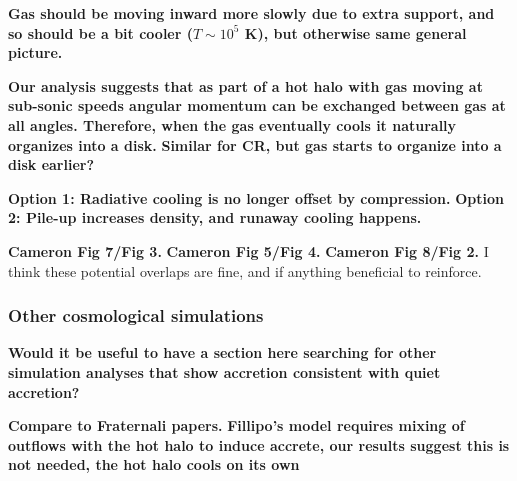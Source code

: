 \documentclass[fleqn,usenatbib]{mnras}
\begin{document}
\textbf{Gas should be moving inward more slowly due to extra support, and so should be a bit cooler ($T\sim 10^5$ K), but otherwise same general picture.}

\textbf{
Our analysis suggests that as part of a hot halo with gas moving at sub-sonic speeds angular momentum can be exchanged between gas at all angles.
Therefore, when the gas eventually cools it naturally organizes into a disk.
}
\textbf{
Similar for CR, but gas starts to organize into a disk earlier?
}

\textbf{Option 1: Radiative cooling is no longer offset by compression.}
\textbf{Option 2: Pile-up increases density, and runaway cooling happens.}

\textbf{Cameron Fig 7/Fig 3.}
\textbf{Cameron Fig 5/Fig 4.}
\textbf{Cameron Fig 8/Fig 2.}
I think these potential overlaps are fine, and if anything beneficial to reinforce.

\subsubsection{Other cosmological simulations}
\label{s: broader prevalance -- other sims}

\textbf{
Would it be useful to have a section here searching for other simulation analyses that show accretion consistent with quiet accretion?
}

\textbf{Compare to Fraternali papers.}
\textbf{Fillipo's model requires mixing of outflows with the hot halo to induce accrete, our results suggest this is not needed, the hot halo cools on its own }
\end{document}
